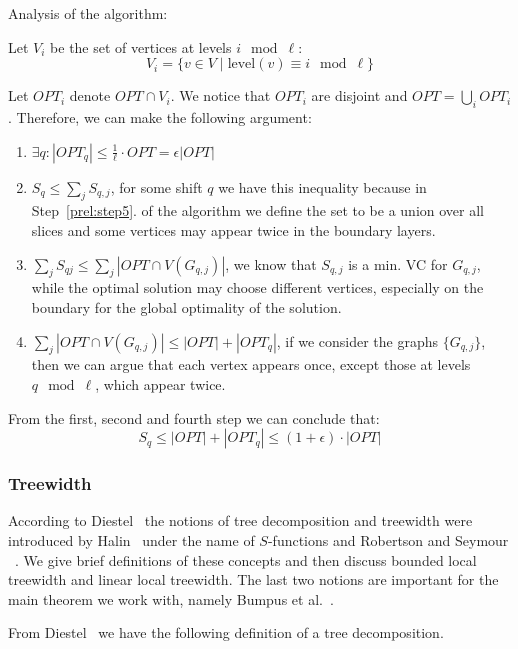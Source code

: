 Analysis of the algorithm:

 Let \( V_i \) be the set of vertices at levels \( i \mod \ell \):
\[ V_i = \{ v \in V \mid \text{level}(v) \equiv i \mod \ell \} \]

 Let $OPT_i$ denote $OPT \cap V_i$. We notice that $OPT_i$ are disjoint and $OPT = \bigcup_{i} OPT_i$. 
Therefore, we can make the following argument: 

\begin{enumerate}
    \item $\exists q: |OPT_q| \leq \frac{1}{\ell} \cdot OPT = \epsilon |OPT|$
    \item $S_q \leq \sum\limits_{j} S_{q, j}$, for some shift $q$ we have this inequality because in Step~\ref{prel:step5}. of the algorithm 
    we define the set to be a union over all slices and some vertices may appear twice in the boundary layers. 
    \item $\sum\limits_{j} S_{qj} \leq \sum\limits_{j} |OPT \cap V(G_{q, j})|$, we know that $S_{q, j}$ is a min. \textsc{VC} for $G_{q, j}$, while the 
    optimal solution may choose different vertices, especially on the boundary for the global optimality of the solution.
    \item $\sum\limits_{j} |OPT \cap V(G_{q, j})| \leq |OPT| + |OPT_q|$, if we consider the graphs $\{G_{q, j}\}$, then we can argue that 
    each vertex appears once, except those at levels $q \mod \ell$, which appear twice. 
\end{enumerate}

 From the first, second and fourth step we can conclude that: \[S_q \leq |OPT| + |OPT_q| \leq (1 + \epsilon) \cdot |OPT|\]

\subsubsection{Treewidth}

According to Diestel~\cite[pp. 354-355]{diestel2025graph} the notions of 
tree decomposition and treewidth were introduced by 
Halin~\cite{halin1976s} under the name of $S$-functions and Robertson and Seymour ~\cite{ROBERTSON1986309}.
We give brief definitions of these concepts and then discuss bounded local treewidth and linear local 
treewidth. The last two notions are important for the main theorem we work with, namely
Bumpus et al.~\cite[Theorem 1.7]{bumpus_et_al:LIPIcs.SWAT.2024.19}.

From Diestel~\cite[Section 12.3]{diestel2025graph} we have the following definition of a 
tree decomposition.


